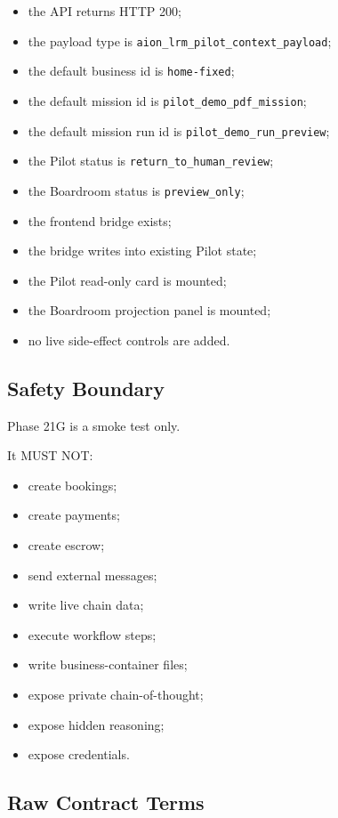 \begin{itemize}
  \item the API returns HTTP 200;
  \item the payload type is \texttt{aion\_lrm\_pilot\_context\_payload};
  \item the default business id is \texttt{home-fixed};
  \item the default mission id is \texttt{pilot\_demo\_pdf\_mission};
  \item the default mission run id is \texttt{pilot\_demo\_run\_preview};
  \item the Pilot status is \texttt{return\_to\_human\_review};
  \item the Boardroom status is \texttt{preview\_only};
  \item the frontend bridge exists;
  \item the bridge writes into existing Pilot state;
  \item the Pilot read-only card is mounted;
  \item the Boardroom projection panel is mounted;
  \item no live side-effect controls are added.
\end{itemize}

\subsection{Safety Boundary}

Phase 21G is a smoke test only.

It MUST NOT:

\begin{itemize}
  \item create bookings;
  \item create payments;
  \item create escrow;
  \item send external messages;
  \item write live chain data;
  \item execute workflow steps;
  \item write business-container files;
  \item expose private chain-of-thought;
  \item expose hidden reasoning;
  \item expose credentials.
\end{itemize}

\subsection{Raw Contract Terms}

